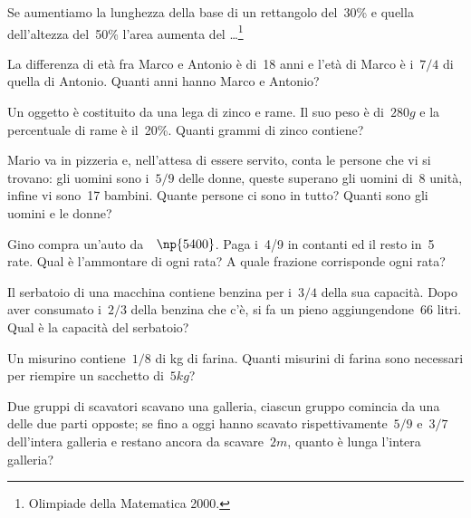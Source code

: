 \begin{multicols}{2}
\begin{esercizio}[\Ast]%
Se aumentiamo la lunghezza della base di un rettangolo del~30\% e quella dell'altezza del~50\% l'area aumenta del \ldots \footnote{Olimpiade della Matematica 2000.}
\end{esercizio}

\begin{esercizio}[\Ast]%
 La differenza di età fra Marco e Antonio è di~18 anni e
l'età di Marco è i~$7/4$ di quella di Antonio. Quanti
anni hanno Marco e Antonio?
\end{esercizio}

\begin{esercizio}%
 Un oggetto è costituito da una lega di zinco e rame. Il suo peso
è di~$280\unit{g}$ e la percentuale di rame è il~20\%. Quanti grammi di zinco
contiene?
\end{esercizio}

\begin{esercizio}[\Ast]%
 Mario va in pizzeria e, nell'attesa di essere
servito, conta le persone che vi si trovano: gli uomini sono i~$5/9$
delle donne, queste superano gli uomini di~8 unità, infine vi sono~17
bambini. Quante persone ci sono in tutto? Quanti sono gli uomini e le
donne?
\end{esercizio}

\begin{esercizio}[\Ast]%
 Gino compra un'auto da~\officialeuro~$\np{5400}$. Paga i~4/9 in contanti ed il resto
in~5 rate. Qual è l'ammontare di ogni rata? A quale
frazione corrisponde ogni rata?
\end{esercizio}

\begin{esercizio}[\Ast]%
 Il serbatoio di una macchina contiene benzina per i~$3/4$ della sua
capacità. Dopo aver consumato i~$2/3$ della benzina che
c'è, si fa un pieno aggiungendone~66 litri. Qual è
la capacità del serbatoio?
\end{esercizio}

\begin{esercizio}%
 Un misurino contiene~$1/8$ di kg di farina. Quanti misurini di farina
sono necessari per riempire un sacchetto di~$5\unit{kg}$?
\end{esercizio}

\begin{esercizio}[\Ast]%
 Due gruppi di scavatori scavano una galleria, ciascun gruppo comincia
da una delle due parti opposte; se fino a oggi hanno scavato
rispettivamente~$5/9$ e~$3/7$ dell'intera galleria e
restano ancora da scavare~$2\unit{m}$, quanto è lunga
l'intera galleria?
\end{esercizio}


\end{multicols}
